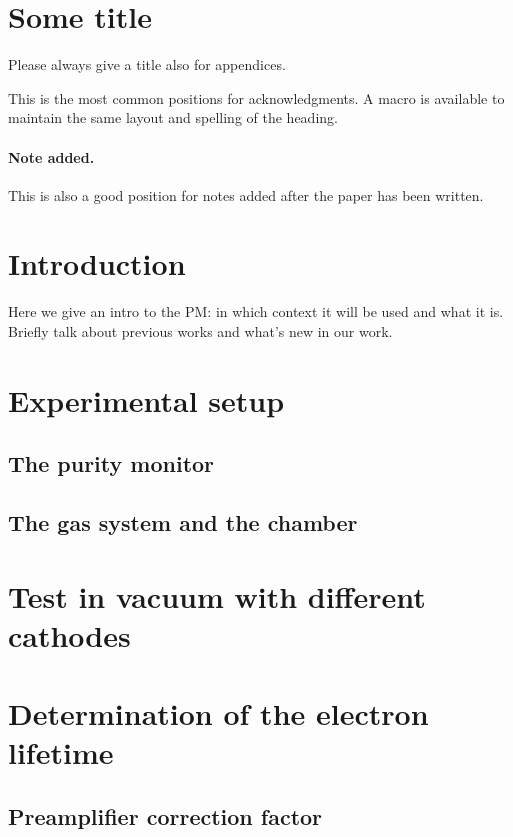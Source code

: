 \documentclass[a4paper,11pt]{article}
\begin{document}
\appendix
\section{Some title}
Please always give a title also for appendices.





\acknowledgments

This is the most common positions for acknowledgments. A macro is
available to maintain the same layout and spelling of the heading.

\paragraph{Note added.} This is also a good position for notes added
after the paper has been written.


\section{Introduction}
Here we give an intro to the PM: in which context it will be used and what it is. Briefly talk about previous works and what's new in our work. 

\section{Experimental setup}
\subsection{The purity monitor}
\subsection{The gas system and the chamber}


\section{Test in vacuum with different cathodes}

\section{Determination of the electron lifetime}
\subsection{Preamplifier correction factor}
\end{document}
